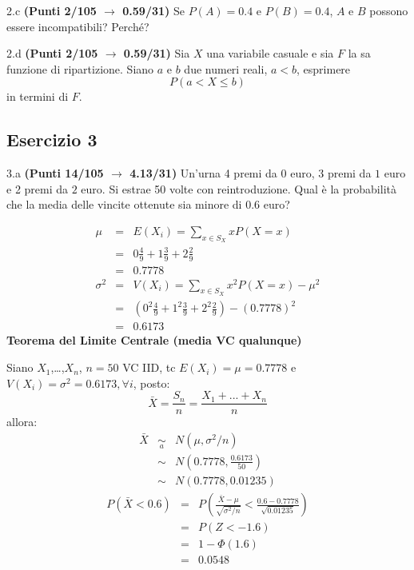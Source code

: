 \documentclass[
  11pt,
]{book}
\theoremstyle{mytheoremstyle}
\theoremstyle{mydefstyle}
\newenvironment{sol}
  {
  \begin{tcolorbox}[enhanced,breakable,arc=0.1mm,boxrule=1pt,colback=white,colframe=iblue,
  title=\bf \fontfamily{lmss}\selectfont \hspace{.5 cm} Soluzione,drop fuzzy shadow]

}{
\end{tcolorbox}
  }
\begin{document}
2.c \textbf{(Punti 2/105 \(\rightarrow\) 0.59/31)} Se \(P(A)=0.4\) e \(P(B)=0.4\), \(A\) e \(B\) possono essere incompatibili? Perché?

2.d \textbf{(Punti 2/105 \(\rightarrow\) 0.59/31)} Sia \(X\) una variabile casuale e sia \(F\) la sa funzione di ripartizione. Siano \(a\) e \(b\) due numeri reali, \(a<b\), esprimere
\[
P(a<X\leq b)
\]
in termini di \(F\).

\subsection{Esercizio 3}\label{esercizio-3-34}

3.a \textbf{(Punti 14/105 \(\rightarrow\) 4.13/31)} Un'urna 4 premi da \(\mbox{0}\) euro, 3 premi da \(\mbox{1}\) euro e 2 premi da \(\mbox{2}\) euro.
Si estrae 50 volte con reintroduzione.
Qual è la probabilità che la media delle vincite ottenute sia minore di 0.6 euro?

\begin{sol}
\begin{eqnarray*} \mu &=& E(X_i) = \sum_{x\in S_X}x P(X=x)\\ 
 &=&  0  \frac { 4 }{ 9 }+ 1  \frac { 3 }{ 9 }+ 2  \frac { 2 }{ 9 } \\ 
            &=& 0.7778 \\ 
 \sigma^2 &=& V(X_i) = \sum_{x\in S_X}x^2 P(X=x)-\mu^2\\ 
 &=&\left(  0  ^2\frac { 4 }{ 9 }+ 1  ^2\frac { 3 }{ 9 }+ 2  ^2\frac { 2 }{ 9 } \right)-( 0.7778 )^2\\ 
            &=& 0.6173 
\end{eqnarray*}
\textbf{Teorema del Limite Centrale (media VC qualunque)}

Siano \(X_1\),\ldots,\(X_n\), \(n=50\) VC IID, tc \(E(X_i)=\mu=0.7778\) e \(V(X_i)=\sigma^2=0.6173,\forall i\), posto:
\[
      \bar X=\frac{S_n}n =\frac{X_1 + ... + X_n}n
      \]
allora:\begin{eqnarray*}
  \bar X & \mathop{\sim}\limits_{a}& N(\mu,\sigma^2/n) \\
     &\sim & N\left(0.7778,\frac{0.6173}{50}\right) \\
     &\sim & N(0.7778,0.01235)
  \end{eqnarray*}\begin{eqnarray*}
      P( \bar X   <   0.6 ) 
        &=& P\left(  \frac { \bar X  -  \mu }{ \sqrt{\sigma^2/n} }  <  \frac { 0.6  -  0.7778 }{\sqrt{ 0.01235 }} \right)  \\
                 &=& P\left(  Z   <   -1.6 \right) \\    
                 &=&  1-\Phi( 1.6 ) \\ &=&  0.0548 
      \end{eqnarray*}

\end{sol}
\end{document}
